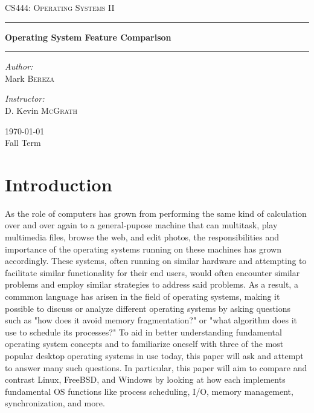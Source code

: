 \documentclass[onecolumn, draftclsnofoot,10pt, compsoc]{IEEEtran}
\begin{document}
\begin{titlepage}
\begin{center}

\vspace*{50mm}

\textsc{\LARGE CS444: Operating Systems II}\\[1.5cm]

\hrule
\vspace{5mm}
{ \huge \bfseries Operating System Feature Comparison \\[0.9cm] }
\hrule 
\vspace{5mm}

\noindent
\begin{minipage}{0.4\textwidth}

\begin{flushleft} \large
\emph{Author:}\\
Mark \textsc{Bereza}
\end{flushleft}
\end{minipage}%
\begin{minipage}{0.4\textwidth}
\begin{flushright} \large
\emph{Instructor:} \\
D. Kevin \textsc{McGrath}
\end{flushright}

\end{minipage}

\vspace*{\fill}
{\large \today}\\
{\large Fall Term}

\end{center}
\end{titlepage}
  
\tableofcontents
\newpage
\renewcommand{\baselinestretch}{1.0}
\linespread{1.0}
\section{Introduction}
As the role of computers has grown from performing the same kind of calculation over and over again to a general-pupose machine that can multitask, play multimedia files, browse the web, and edit photos, the responsibilities and importance of the operating systems running on these machines has grown accordingly. These systems, often running on similar hardware and attempting to facilitate similar functionality for their end users, would often encounter similar problems and employ similar strategies to address said problems. As a result, a commmon language has arisen in the field of operating systems, making it possible to discuss or analyze different operating systems by asking questions such as "how does it avoid memory fragmentation?" or "what algorithm does it use to schedule its processes?" To aid in better understanding fundamental operating system concepts and to familiarize oneself with three of the most popular desktop operating systems in use today, this paper will ask and attempt to answer many such questions. In particular, this paper will aim to compare and contrast Linux, FreeBSD, and Windows by looking at how each implements fundamental OS functions like process scheduling, I/O, memory management, synchronization, and more.
\end{document}
